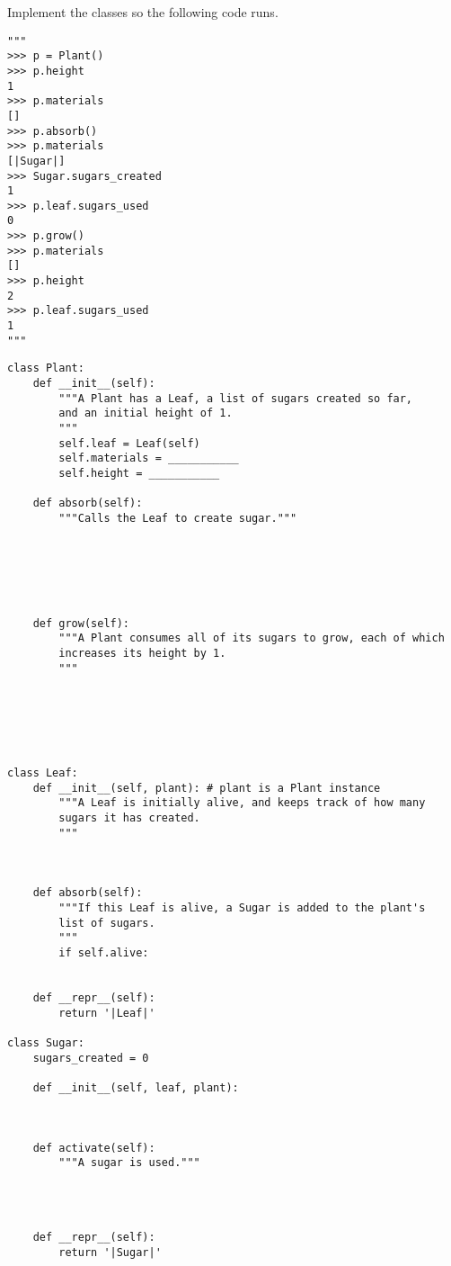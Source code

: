 \begin{blocksection}
\question Implement the classes so the following code runs.

\begin{lstlisting}
"""
>>> p = Plant()
>>> p.height
1
>>> p.materials
[]
>>> p.absorb()
>>> p.materials
[|Sugar|]
>>> Sugar.sugars_created
1
>>> p.leaf.sugars_used
0
>>> p.grow()
>>> p.materials
[]
>>> p.height
2
>>> p.leaf.sugars_used
1
"""
\end{lstlisting}
\end{blocksection}

\ifprintanswers\else
\begin{lstlisting}
class Plant:
    def __init__(self):
        """A Plant has a Leaf, a list of sugars created so far,
        and an initial height of 1.
        """
        self.leaf = Leaf(self)
        self.materials = ___________
        self.height = ___________

    def absorb(self):
        """Calls the Leaf to create sugar."""






    def grow(self):
        """A Plant consumes all of its sugars to grow, each of which
        increases its height by 1.
        """






class Leaf:
    def __init__(self, plant): # plant is a Plant instance
        """A Leaf is initially alive, and keeps track of how many
        sugars it has created.
        """



    def absorb(self):
        """If this Leaf is alive, a Sugar is added to the plant's
        list of sugars.
        """
        if self.alive:


    def __repr__(self):
        return '|Leaf|'

class Sugar:
    sugars_created = 0

    def __init__(self, leaf, plant):



    def activate(self):
        """A sugar is used."""




    def __repr__(self):
        return '|Sugar|'
\end{lstlisting}
\fi

